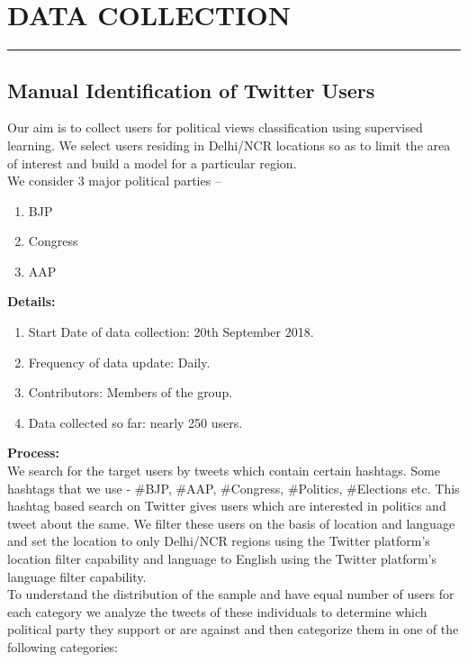 \documentclass[a4paper,11pt]{article}
\begin{document}
\section{DATA COLLECTION}
\hrule
\vspace*{5mm}

\subsection{Manual Identification of Twitter Users}
Our aim is to collect users for political views classification using supervised learning.
We select users residing in Delhi/NCR locations so as to limit the area of interest and build a model for a particular region.
\medskip\\
We consider 3 major political parties –
\begin{enumerate}
    \item BJP
    \item Congress
    \item AAP
\end{enumerate}
\medskip
\medskip
\textbf{Details:}
\begin{enumerate}
    \item Start Date of data collection: 20th September 2018.    \item Frequency of data update: Daily.
    \item Contributors: Members of the group.
    \item Data collected so far:  nearly 250 users.
\end{enumerate}
\textbf{Process:}
\medskip\\
We search for the target users by tweets which contain certain hashtags. Some hashtags that we use - \#BJP, \#AAP, \#Congress, \#Politics, \#Elections etc. This hashtag based search on Twitter gives users which are interested in politics and tweet about the same. We filter these users on the basis of location and language and set the location to only Delhi/NCR regions using the Twitter platform’s location filter capability and language to English using the Twitter platform's language filter capability.\\
To understand the distribution of the sample and have equal number of users for each category we analyze the tweets of these individuals to determine which political party they support or are against and then categorize them in one of the following categories:
\end{document}
